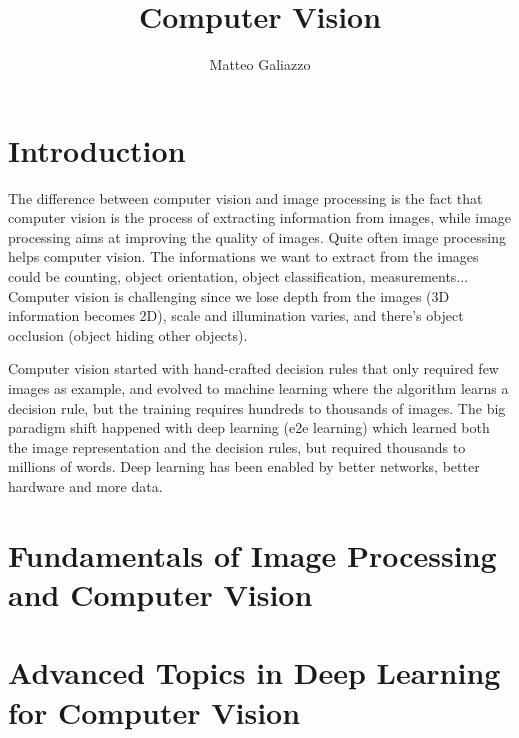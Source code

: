 \documentclass{article}
\title{Computer Vision}
\author{Matteo Galiazzo}
\begin{document}
\maketitle

\tableofcontents

\section{Introduction}

The difference between computer vision and image processing is the fact that computer vision is the process of extracting information from images, while image processing aims at improving the quality of images.
Quite often image processing helps computer vision.
The informations we want to extract from the images could be counting, object orientation, object classification, measurements...
Computer vision is challenging since we lose depth from the images (3D information becomes 2D), scale and illumination varies, and there's object occlusion (object hiding other objects).

Computer vision started with hand-crafted decision rules that only required few images as example, and evolved to machine learning where the algorithm learns a decision rule, but the training requires hundreds to thousands of images.
The big paradigm shift happened with deep learning (e2e learning) which learned both the image representation and the decision rules, but required thousands to millions of words.
Deep learning has been enabled by better networks, better hardware and more data.


\section{Fundamentals of Image Processing and Computer Vision}

\section{Advanced Topics in Deep Learning for Computer Vision}

\end{document}
